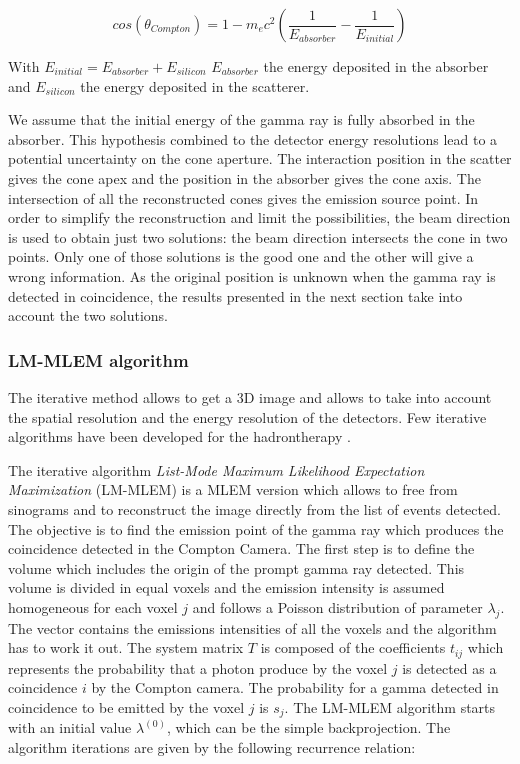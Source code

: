 \documentclass[11pt]{iopart}
\begin{document}
\begin{equation}
cos(\theta_{Compton}) = 1-m_ec^2\left(\frac{1}{E_{absorber}}-\frac{1}{E_{initial}}\right)
\end{equation}

	
With $E_{initial} = E_{absorber} + E_{silicon}$\newline
$E_{absorber}$ the energy deposited in the absorber and $E_{silicon}$ the energy deposited in the scatterer.\newline

We assume that the initial energy of the gamma ray is fully absorbed in the absorber. This hypothesis combined to the detector energy resolutions lead to a potential uncertainty on the cone aperture. The interaction position in the scatter gives the cone apex and the position in the absorber gives the cone axis. The intersection of all the reconstructed cones gives the emission source point. In order to simplify the reconstruction and limit the possibilities, the beam direction is used to obtain just two solutions: the beam direction intersects the cone in two points. Only one of those solutions is the good one and the other will give a wrong information. As the original position is unknown when the gamma ray is detected in coincidence, the results presented in the next section take into account the two solutions.\newline

\subsubsection{LM-MLEM algorithm}	

The iterative method allows to get a 3D image and allows to take into account the spatial resolution and the energy resolution of the detectors. Few iterative algorithms have been developed for the hadrontherapy  \cite{schone_common_2010, zoglauer_design_2011,gillam_compton_2011,mackin_evaluation_2012,lojacono_low_2013}.

The iterative algorithm  \textit{List-Mode Maximum Likelihood Expectation Maximization} (LM-MLEM) is a MLEM version which allows to free from sinograms and to reconstruct the image directly from the list of events detected. \newline
The objective is to find the emission point of the gamma ray which produces the coincidence detected in the Compton Camera. 
The first step is to define the volume which includes the origin of the prompt gamma ray detected. This volume is divided in equal voxels and the emission intensity is assumed homogeneous for each voxel $j$ and follows a Poisson distribution of parameter $\lambda_j$. The vector contains the emissions intensities of all the voxels and the algorithm has to work it out. The system matrix $T$ is composed of the coefficients  $t_{ij}$ which represents the probability that a photon produce by the voxel $j$ is detected as a coincidence $i$ by the Compton camera. The probability for a gamma detected in coincidence to be emitted by the voxel $j$ is $s_j$.
The LM-MLEM algorithm starts with an initial value $\lambda^{(0)}$, which can be the simple backprojection.
The algorithm iterations are given by the following recurrence relation:
\end{document}
